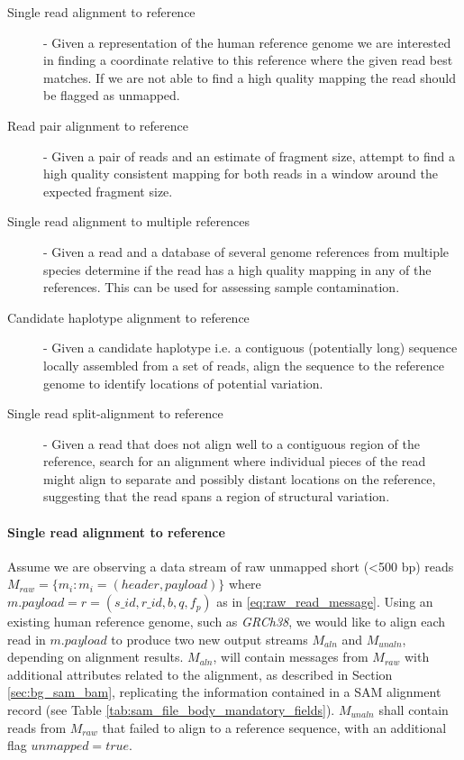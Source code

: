 \begin{description}
    \item [Single read alignment to reference] - Given a representation of the human reference genome we are interested in finding a coordinate relative to this reference where the given read best matches. If we are not able to find a high quality mapping the read should be flagged as unmapped.
    \item [Read pair alignment to reference] - Given a pair of reads and an estimate of fragment size, attempt to find a high quality consistent mapping for both reads in a window around the expected fragment size.
    \item [Single read alignment to multiple references] - Given a read and a database of several genome references from multiple species determine if the read has a high quality mapping in any of the references. This can be used for assessing sample contamination.
    \item [Candidate haplotype alignment to reference] - Given a candidate haplotype i.e. a contiguous (potentially long) sequence locally assembled from a set of reads, align the sequence to the reference genome to identify locations of potential variation.
    \item [Single read split-alignment to reference] - Given a read that does not align well to a contiguous region of the reference, search for an alignment where individual pieces of the read might align to separate and possibly distant locations on the reference, suggesting that the read spans a region of structural variation.
\end{description}

\paragraph{Single read alignment to reference} 
Assume we are observing a data stream of raw unmapped short (<500 bp) reads $M_{raw} = \{m_i: m_i = (header, payload)\}$ where $m.payload = r = (s\_id, r\_id, b, q, f_p)$ as in \ref{eq:raw_read_message}. Using an existing human reference genome, such as \emph{GRCh38}, we would like to align each read in $m.payload$ to produce two new output streams $M_{aln}$ and $M_{unaln}$, depending on alignment results. $M_{aln}$, will contain messages from $M_{raw}$ with additional attributes related to the alignment, as described in Section \ref{sec:bg_sam_bam}, replicating the information contained in a SAM alignment record (see Table \ref{tab:sam_file_body_mandatory_fields}). $M_{unaln}$ shall contain reads from $M_{raw}$ that failed to align to a reference sequence, with an additional flag $unmapped=true$.

